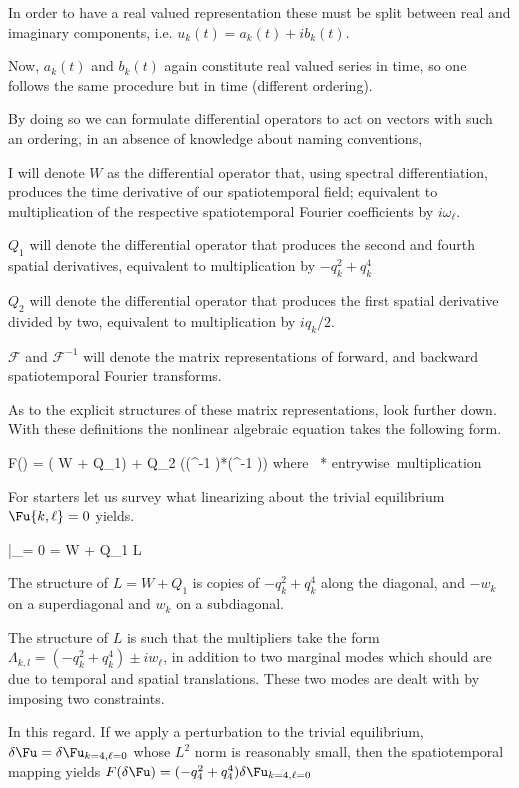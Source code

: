 In order to have a real valued representation these must be split between real and
imaginary components, i.e. $u_k(t) = a_k(t) + i b_k(t)$.

Now, $a_k(t)$ and $b_k(t)$ again constitute real valued series in time, so one follows the same procedure but in time (different ordering).

By doing so we can formulate differential operators to act on vectors with such an ordering,
in an absence of knowledge about naming conventions,

I will denote $W$ as the differential operator that, using spectral
differentiation, produces the time derivative of our spatiotemporal field; equivalent to multiplication of
the respective spatiotemporal Fourier coefficients
by $i \omega_\ell$.

$Q_1$ will denote
the differential operator that produces the second and fourth spatial derivatives, equivalent
to multiplication by $-q_k^2 +q_k^4$

$Q_2$ will denote
the differential operator that produces the first spatial derivative divided by two, equivalent
to multiplication by $i q_k / 2$.

$\mathcal{F}$ and $\mathcal{F}^{-1}$ will denote the matrix representations
of forward, and backward spatiotemporal Fourier transforms.

As to the explicit structures of these matrix representations, look further down.
With these definitions the nonlinear algebraic equation takes the following form.

\beq
F(\Fu) = ( W + Q_1) \Fu + Q_2  ((^{-1} \Fu)*(^{-1} \Fu)) \mbox{where} \, * \equiv \mbox{entrywise multiplication}
\eeq

For starters let us survey what linearizing about the trivial equilibrium $\Fu{k,\ell}=0$ yields.

\beq \label{e-MNGstlintriv}
|_{\Fu = 0} = W + Q_1 \equiv L
\eeq

The structure of $L = W + Q_1$ is copies of $-q_k^2 +q_k^4$ along the diagonal, and $-w_k$ on a
superdiagonal and $w_k$ on a subdiagonal.

The structure of $L$ is such that the multipliers take
the form $\Lambda_{k,l} = (-q_k^2 +q_k^4) \pm i w_\ell$, in addition to two marginal modes which should
are due to temporal and spatial translations. These two modes are dealt with by imposing two constraints.

In this regard. If we apply a perturbation to the trivial equilibrium, $\delta \Fu = \delta \Fu_{k=4,\ell=0}$
whose $L^2$ norm is reasonably small, then the spatiotemporal mapping yields $F(\delta \Fu) = (-q_4^2 +q_4^4)\delta \Fu_{k=4,\ell=0}$

